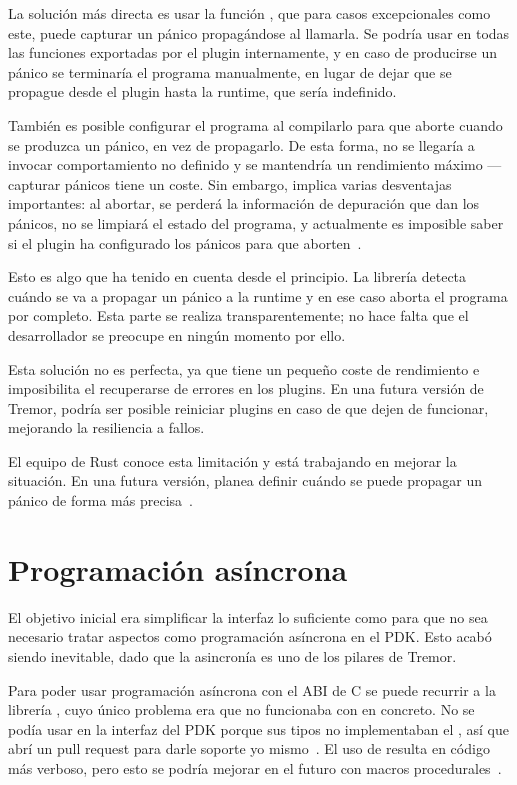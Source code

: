 La solución más directa es usar la función , que
para casos excepcionales como este, puede capturar un pánico propagándose al
llamarla. Se podría usar en todas las funciones exportadas por el plugin
internamente, y en caso de producirse un pánico se terminaría el programa
manualmente, en lugar de dejar que se propague desde el plugin hasta la runtime,
que sería indefinido.

También es posible configurar el programa al compilarlo para que aborte cuando
se produzca un pánico, en vez de propagarlo. De esta forma, no se llegaría a
invocar comportamiento no definido y se mantendría un rendimiento máximo ---
capturar pánicos tiene un coste. Sin embargo, implica varias desventajas
importantes: al abortar, se perderá la información de depuración que dan los
pánicos, no se limpiará el estado del programa, y actualmente es imposible saber
si el plugin ha configurado los pánicos para que aborten~\cite{pluggablepanic}.

Esto es algo que \abistable ha tenido en cuenta desde el principio. La librería
detecta cuándo se va a propagar un pánico a la runtime y en ese caso aborta el
programa por completo. Esta parte se realiza transparentemente; no hace falta
que el desarrollador se preocupe en ningún momento por ello.

Esta solución no es perfecta, ya que tiene un pequeño coste de rendimiento e
imposibilita el recuperarse de errores en los plugins. En una futura versión de
Tremor, podría ser posible reiniciar plugins en caso de que dejen de funcionar,
mejorando la resiliencia a fallos.

El equipo de Rust conoce esta limitación y está trabajando en mejorar la
situación. En una futura versión, planea definir cuándo se puede propagar un
pánico de forma más precisa~\cite{cunwind}.

\section{Programación asíncrona}

El objetivo inicial era simplificar la interfaz lo suficiente como para que no
sea necesario tratar aspectos como programación asíncrona en el PDK. Esto acabó
siendo inevitable, dado que la asincronía es uno de los pilares de Tremor.

Para poder usar programación asíncrona con el ABI de C se puede recurrir a la
librería , cuyo único problema era que no funcionaba con
\abistable en concreto. No se podía usar en la interfaz del PDK porque sus tipos
no implementaban el \trait {}, así que abrí un pull request para
darle soporte yo mismo~\cite{asyncfficontrib}. El uso de 
resulta en código más verboso, pero esto se podría mejorar en el futuro con
macros procedurales~\cite{asyncffimacro}.

